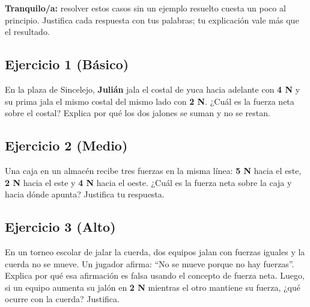 \documentclass[
  spanish,
  letterpaper,
  12pt,
  oneside,
  open=any,
  DIV=15]{scrbook}
\begin{document}
\begin{tcolorbox}[enhanced jigsaw, arc=.35mm, bottomrule=.15mm, bottomtitle=1mm, breakable, colback=white, colbacktitle=quarto-callout-note-color!10!white, colframe=quarto-callout-note-color-frame, coltitle=black, left=2mm, leftrule=.75mm, opacityback=0, opacitybacktitle=0.6, rightrule=.15mm, title=\textcolor{quarto-callout-note-color}{\faInfo}\hspace{0.5em}{Apoyo Socioemocional}, titlerule=0mm, toprule=.15mm, toptitle=1mm]

\textbf{Tranquilo/a:} resolver estos casos sin un ejemplo resuelto
cuesta un poco al principio. Justifica cada respuesta con tus palabras;
tu explicación vale más que el resultado.

\end{tcolorbox}

\subsection{Ejercicio 1 (Básico)}\label{ejercicio-1-buxe1sico-2}

En la plaza de Sincelejo, \textcolor[HTML]{7C3AED}{\textbf{Julián}} jala
el costal de yuca hacia adelante con \textcolor[HTML]{7C3AED}{\textbf{4
N}} y su prima jala el mismo costal del mismo lado con
\textcolor[HTML]{2563EB}{\textbf{2 N}}. ¿Cuál es la fuerza neta sobre el
costal? Explica por qué los dos jalones se suman y no se restan.

\subsection{Ejercicio 2 (Medio)}\label{ejercicio-2-medio-2}

Una caja en un almacén recibe tres fuerzas en la misma línea:
\textcolor[HTML]{7C3AED}{\textbf{5 N}} hacia el este,
\textcolor[HTML]{7C3AED}{\textbf{2 N}} hacia el este y
\textcolor[HTML]{2563EB}{\textbf{4 N}} hacia el oeste. ¿Cuál es la
fuerza neta sobre la caja y hacia dónde apunta? Justifica tu respuesta.

\subsection{Ejercicio 3 (Alto)}\label{ejercicio-3-alto-1}

En un torneo escolar de jalar la cuerda, dos equipos jalan con fuerzas
iguales y la cuerda no se mueve. Un jugador afirma: ``No se mueve porque
no hay fuerzas''. Explica por qué esa afirmación es falsa usando el
concepto de fuerza neta. Luego, si un equipo aumenta su jalón en
\textcolor[HTML]{7C3AED}{\textbf{2 N}} mientras el otro mantiene su
fuerza, ¿qué ocurre con la cuerda? Justifica.
\end{document}

